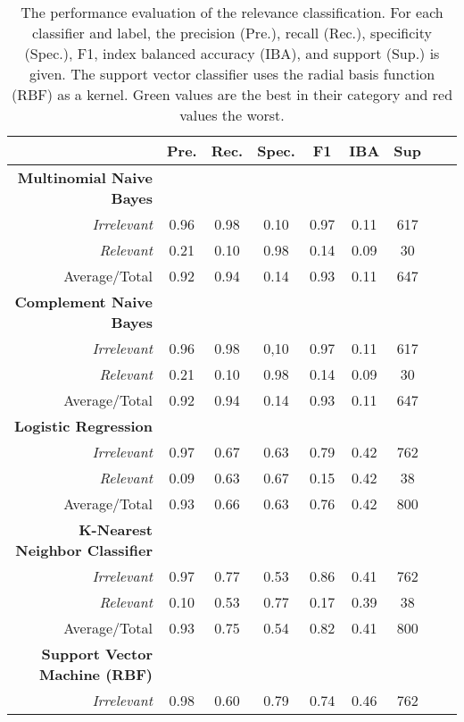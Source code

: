   \begin{table}
    \caption{The performance evaluation of the relevance classification. For each classifier and label, the precision (Pre.), recall (Rec.), specificity (Spec.), F1, index balanced accuracy (IBA), and support (Sup.) is given. The support vector classifier uses the radial basis function (RBF) as a kernel. Green values are the best in their category and red values the worst.}
    \centering
    \begin{tabular}{@{}rcccccccc@{}}
      \toprule
       & \textbf{Pre.} & \textbf{Rec.} & \textbf{Spec.}
      & \textbf{F1} &  \textbf{IBA}& \textbf{Sup} \\
      \midrule
      \textbf{Multinomial Naive Bayes}\\
      \textsl{Irrelevant}& 0.96& 0.98&  0.10& 0.97& 0.11& 617 \\
      \textsl{Relevant}& 0.21& 0.10&  0.98& 0.14& 0.09& 30 \\
      Average/Total& 0.92& 0.94& 0.14& 0.93& 0.11& 647 \vspace{2mm}\\
      \textbf{Complement Naive Bayes}\\
      \textsl{Irrelevant}& 0.96& 0.98&  0,10& 0.97& 0.11& 617 \\
      \textsl{Relevant}& 0.21& 0.10&  0.98& 0.14& 0.09& 30 \\
      Average/Total& 0.92& 0.94& 0.14& 0.93& 0.11& 647 \vspace{2mm}\\
      \textbf{Logistic Regression}\\
      \textsl{Irrelevant}& 0.97& 0.67&  0.63& 0.79& 0.42& 762 \\
      \textsl{Relevant}& 0.09& 0.63&  0.67& 0.15& 0.42& 38 \\
      Average/Total& 0.93& 0.66& 0.63& 0.76& 0.42& 800 \vspace{2mm}\\
      \textbf{K-Nearest Neighbor Classifier}\\
      \textsl{Irrelevant}& 0.97& 0.77&  0.53& 0.86& 0.41& 762 \\
      \textsl{Relevant}& 0.10& 0.53&  0.77& 0.17& 0.39& 38 \\
      Average/Total& 0.93& 0.75& 0.54& 0.82& 0.41& 800 \vspace{2mm}\\
      \textbf{Support Vector Machine (RBF)}\\
      \textsl{Irrelevant}& 0.98& 0.60&  0.79& 0.74& 0.46& 762 \\

\end{tabular}
\end{table}
